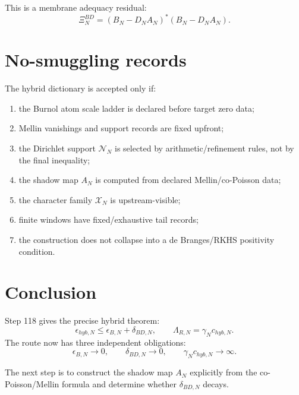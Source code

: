 \documentclass[11pt]{article}
\begin{document}
This is a membrane adequacy residual:
\[
\Xi^{BD}_N=(B_N-D_NA_N)^*(B_N-D_NA_N).
\]

\section{No-smuggling records}

The hybrid dictionary is accepted only if:

\begin{enumerate}[label=\textbf{H\arabic*.}]
\item the Burnol atom scale ladder is declared before target zero data;
\item Mellin vanishings and support records are fixed upfront;
\item the Dirichlet support \(\mathcal N_N\) is selected by arithmetic/refinement rules, not by the final inequality;
\item the shadow map \(A_N\) is computed from declared Mellin/co-Poisson data;
\item the character family \(\mathcal X_N\) is upstream-visible;
\item finite windows have fixed/exhaustive tail records;
\item the construction does not collapse into a de Branges/RKHS positivity condition.
\end{enumerate}

\section{Conclusion}

Step 118 gives the precise hybrid theorem:
\[
\epsilon_{hyb,N}
\le
\epsilon_{B,N}+\delta_{BD,N},
\qquad
\Lambda_{R,N}
=
\gamma_Nc_{hyb,N}.
\]
The route now has three independent obligations:
\[
\epsilon_{B,N}\to0,
\qquad
\delta_{BD,N}\to0,
\qquad
\gamma_Nc_{hyb,N}\to\infty.
\]

The next step is to construct the shadow map \(A_N\) explicitly from the co-Poisson/Mellin
formula and determine whether \(\delta_{BD,N}\) decays.
\end{document}
